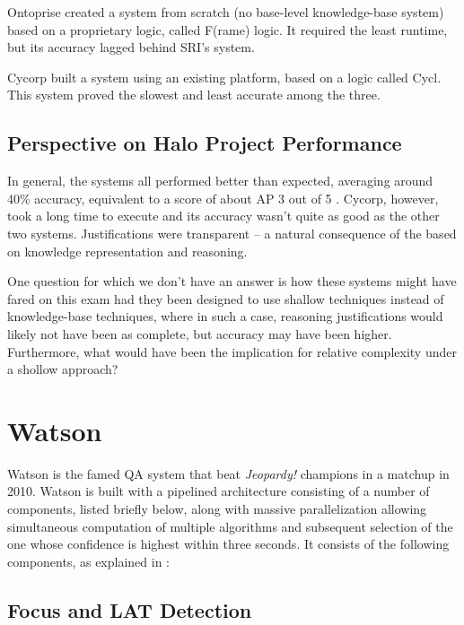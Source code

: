 Ontoprise created a system from scratch (no base-level knowledge-base system) based on a proprietary logic, called F(rame) logic.  It required the least runtime, but its accuracy lagged behind SRI's system.

Cycorp built a system using an existing platform, based on a logic called Cycl.  This system proved the slowest and least accurate among the three.

\subsection{Perspective on Halo Project Performance}

In general, the systems all performed better than expected, averaging around 40\% accuracy, equivalent to a score of about AP 3 out of 5 \cite{friedland2004project}.  Cycorp, however, took a long time to execute and its accuracy wasn't quite as good as the other two systems.  Justifications were transparent -- a natural consequence of the based on knowledge representation and reasoning.  

One question for which we don't have an answer is how these systems might have fared on this exam had they been designed to use shallow techniques instead of knowledge-base techniques, where in such a case, reasoning justifications would likely not have been as complete, but accuracy may have been higher.  Furthermore, what would have been the implication for relative complexity under a shollow approach?



\section{Watson}

Watson \cite{ferrucci2010building} is the famed QA system that beat \textit{Jeopardy!} champions in a matchup in 2010.  Watson is built with a pipelined architecture consisting of a number of components, listed briefly below, along with massive parallelization allowing simultaneous computation of multiple algorithms and subsequent selection of the one whose confidence is highest within three seconds.  It consists of the following components, as explained in \cite{ferrucci2010building}:

\subsection{Focus and LAT Detection}

